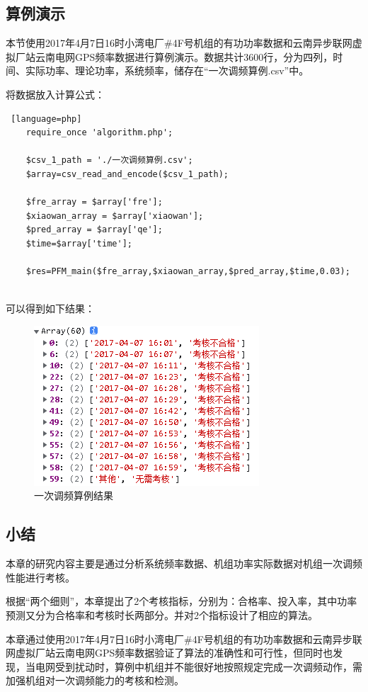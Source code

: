 \documentclass[winfonts,UTF8,a4paper]{ctexart}
\begin{document}
\subsection{算例演示}
本节使用2017年4月7日16时小湾电厂\#4F号机组的有功功率数据和云南异步联网虚拟厂站云南电网GPS频率数据进行算例演示。数据共计3600行，分为四列，时间、实际功率、理论功率，系统频率，储存在“一次调频算例.csv”中。

将数据放入计算公式：
\begin{lstlisting} [language=php]
	require_once 'algorithm.php';
	
	$csv_1_path = './一次调频算例.csv';
	$array=csv_read_and_encode($csv_1_path);
	
	$fre_array = $array['fre'];
	$xiaowan_array = $array['xiaowan'];
	$pred_array = $array['qe'];
	$time=$array['time'];
	
	$res=PFM_main($fre_array,$xiaowan_array,$pred_array,$time,0.03);
	
\end{lstlisting}

可以得到如下结果：
\begin{figure}[H]
	\centering
	\includegraphics[width=0.5\linewidth]{pic/screenshot024}
	\caption{一次调频算例结果}
	\label{fig:screenshot024}
\end{figure}

\subsection{小结}
本章的研究内容主要是通过分析系统频率数据、机组功率实际数据对机组一次调频性能进行考核。

根据“两个细则”，本章提出了2个考核指标，分别为：合格率、投入率，其中功率预测又分为合格率和考核时长两部分。并对2个指标设计了相应的算法。

本章通过使用2017年4月7日16时小湾电厂\#4F号机组的有功功率数据和云南异步联网虚拟厂站云南电网GPS频率数据验证了算法的准确性和可行性，但同时也发现，当电网受到扰动时，算例中机组并不能很好地按照规定完成一次调频动作，需加强机组对一次调频能力的考核和检测。
\end{document}
